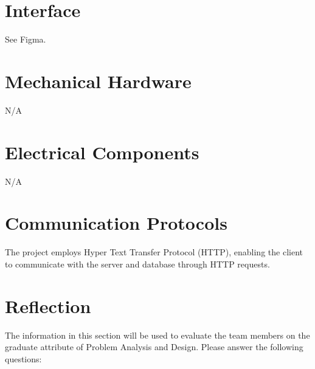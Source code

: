 \documentclass[12pt, titlepage]{article}
\begin{document}
	\newpage{}
	
	\appendix
	
	\section{Interface}
	
	See Figma.
	
	\section{Mechanical Hardware}
	N/A
	
	\section{Electrical Components}
	N/A
	
	\section{Communication Protocols}
	The project employs Hyper Text Transfer Protocol (HTTP), enabling the client to communicate with the server and database through HTTP requests.
	
	\section{Reflection}
	
	The information in this section will be used to evaluate the team members on the
	graduate attribute of Problem Analysis and Design.  Please answer the following questions:
	
\end{document}
